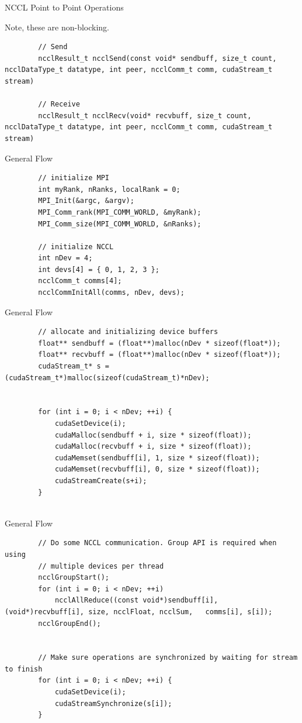 \begin{frame}[fragile]{NCCL Point to Point Operations}
	
	Note, these are non-blocking.
	
	\begin{verbatim}
		// Send
		ncclResult_t ncclSend(const void* sendbuff, size_t count, ncclDataType_t datatype, int peer, ncclComm_t comm, cudaStream_t stream)
		
		// Receive
		ncclResult_t ncclRecv(void* recvbuff, size_t count, ncclDataType_t datatype, int peer, ncclComm_t comm, cudaStream_t stream)
	\end{verbatim}
\end{frame}

\begin{frame}[fragile]{General Flow}
	
	\begin{verbatim}
		// initialize MPI
		int myRank, nRanks, localRank = 0;
		MPI_Init(&argc, &argv);
		MPI_Comm_rank(MPI_COMM_WORLD, &myRank);
		MPI_Comm_size(MPI_COMM_WORLD, &nRanks);
		
		// initialize NCCL
		int nDev = 4;
		int devs[4] = { 0, 1, 2, 3 };
		ncclComm_t comms[4];
		ncclCommInitAll(comms, nDev, devs);
	\end{verbatim}
\end{frame}

\begin{frame}[fragile]{General Flow}
	
	\begin{verbatim}
		// allocate and initializing device buffers
		float** sendbuff = (float**)malloc(nDev * sizeof(float*));
		float** recvbuff = (float**)malloc(nDev * sizeof(float*));
		cudaStream_t* s = (cudaStream_t*)malloc(sizeof(cudaStream_t)*nDev);
		
		
		for (int i = 0; i < nDev; ++i) {
			cudaSetDevice(i);
			cudaMalloc(sendbuff + i, size * sizeof(float));
			cudaMalloc(recvbuff + i, size * sizeof(float));
			cudaMemset(sendbuff[i], 1, size * sizeof(float));
			cudaMemset(recvbuff[i], 0, size * sizeof(float));
			cudaStreamCreate(s+i);
		}
	
	\end{verbatim}
\end{frame}

\begin{frame}[fragile]{General Flow}
	
	\begin{verbatim}
		// Do some NCCL communication. Group API is required when using
		// multiple devices per thread
		ncclGroupStart();
		for (int i = 0; i < nDev; ++i)
		 	ncclAllReduce((const void*)sendbuff[i], (void*)recvbuff[i], size, ncclFloat, ncclSum,	comms[i], s[i]);
		ncclGroupEnd();
		
		
		// Make sure operations are synchronized by waiting for stream to finish
		for (int i = 0; i < nDev; ++i) {
			cudaSetDevice(i);
			cudaStreamSynchronize(s[i]);
		}
	\end{verbatim}
\end{frame}

